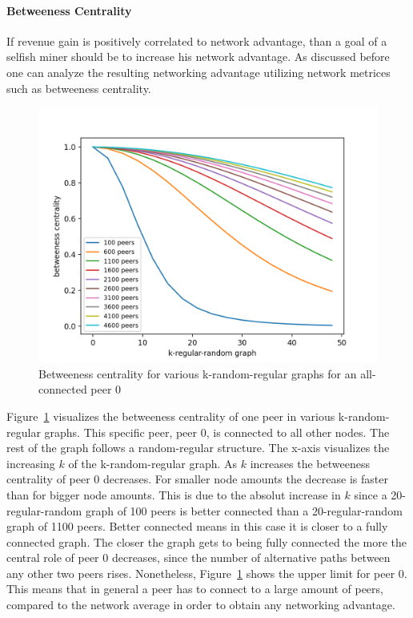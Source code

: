 \paragraph{Betweeness Centrality}
If revenue gain is positively correlated to network advantage, than a goal of a selfish miner should be to increase his network advantage. As discussed before one can analyze the resulting networking advantage utilizing network metrices such as betweeness centrality.
\begin{figure}[h]
	\includegraphics[width=\textwidth]{figures/betweeness_centrality.png}
	\caption{Betweeness centrality for various k-random-regular graphs for an all-connected peer $0$}
	\label{fig:bet_cent}
\end{figure}
Figure~\ref{fig:bet_cent} visualizes the betweeness centrality of one peer in various k-random-regular graphs. This specific peer, peer $0$, is connected to all other nodes. The rest of the graph follows a random-regular structure. The x-axis visualizes the increasing $k$ of the k-random-regular graph. As $k$ increases the betweeness centrality of peer $0$ decreases. For smaller node amounts the decrease is faster than for bigger node amounts. This is due to the absolut increase in $k$ since a 20-regular-random graph of 100 peers is better connected than a 20-regular-random graph of 1100 peers. Better connected means in this case it is closer to a fully connected graph. The closer the graph gets to being fully connected the more the central role of peer $0$ decreases, since the number of alternative paths between any other two peers rises. Nonetheless, Figure~\ref{fig:bet_cent} shows the upper limit for peer $0$. This means that in general a peer has to connect to a large amount of peers, compared to the network average in order to obtain any networking advantage.

